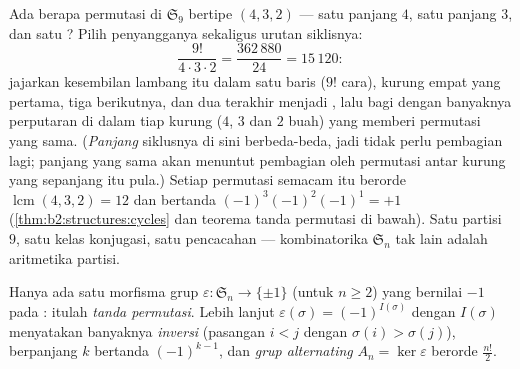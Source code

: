 \begin{example}\label{ex:b2:structures:cycletype}
Ada berapa permutasi di $\mathfrak{S}_9$ bertipe 
$(4, 3, 2)$ --- satu  panjang $4$, satu  panjang $3$, dan
satu ? Pilih penyangganya sekaligus urutan siklisnya:
\[
\frac{9!}{4\cdot 3\cdot 2}
= \frac{362\,880}{24} = 15\,120 :
\]
jajarkan kesembilan lambang itu dalam satu baris ($9!$ cara), kurung
empat yang pertama, tiga berikutnya, dan dua terakhir menjadi
, lalu bagi dengan banyaknya perputaran di dalam tiap kurung
($4$, $3$ dan $2$ buah) yang memberi permutasi yang sama.
(\emph{Panjang} siklusnya di sini berbeda-beda, jadi tidak perlu
pembagian lagi; panjang yang sama akan menuntut pembagian oleh
permutasi antar kurung yang sepanjang itu pula.) Setiap permutasi
semacam itu berorde $\operatorname{lcm}(4,3,2) = 12$ dan bertanda
$(-1)^3(-1)^2(-1)^1 = +1$
(\cref{thm:b2:structures:cycles} dan teorema tanda permutasi di
bawah). Satu partisi $9$, satu kelas konjugasi, satu pencacahan
--- kombinatorika $\mathfrak{S}_n$ tak lain adalah aritmetika
partisi.
\end{example}

\begin{theorem}\label{thm:b2:structures:signature}
Hanya ada satu morfisma grup $\varepsilon \colon
\mathfrak{S}_n \to \{\pm 1\}$ (untuk $n \geq 2$) yang bernilai $-1$
pada : itulah \emph{tanda permutasi}.
Lebih lanjut $\varepsilon(\sigma) = (-1)^{I(\sigma)}$ dengan $I(\sigma)$
menyatakan banyaknya \emph{inversi} (pasangan $i < j$ dengan $\sigma(i) >
\sigma(j)$),  berpanjang $k$ bertanda $(-1)^{k-1}$, dan
\emph{grup alternating} $A_n = \ker\varepsilon$ berorde
$\frac{n!}{2}$.
\end{theorem}

